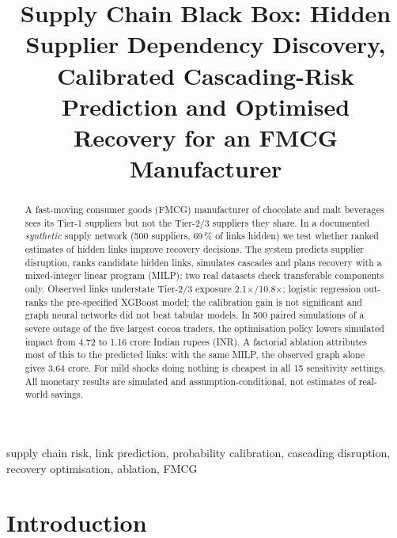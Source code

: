 \documentclass[conference]{IEEEtran}
\newcommand{\GapTwo}{2.1}
\newcommand{\GapThree}{10.8}
\newcommand{\SevA}{4.72}
\newcommand{\SevC}{1.16}
\newcommand{\AblCobs}{3.64}
\newcommand{\SensN}{15}
\begin{document}
\title{Supply Chain Black Box: Hidden Supplier Dependency Discovery, Calibrated Cascading-Risk Prediction and Optimised Recovery for an FMCG Manufacturer}

\author{
}

\maketitle

\begin{abstract}
A fast-moving consumer goods (FMCG) manufacturer of chocolate and malt beverages sees its Tier-1 suppliers but not the Tier-2/3 suppliers they share. In a documented
\emph{synthetic} supply network (500 suppliers, 69\,\% of links hidden) we test whether ranked estimates of hidden links improve recovery
decisions. The system predicts supplier disruption, ranks candidate hidden links, simulates cascades and plans recovery with a mixed-integer linear
program (MILP); two real datasets check transferable components only. Observed links
understate Tier-2/3 exposure \GapTwo$\times$/\GapThree$\times$; logistic regression out-ranks the pre-specified XGBoost model; the calibration gain is not significant and
graph neural networks did not beat tabular models. In 500 paired simulations of a severe outage of the five largest cocoa traders, the
optimisation policy lowers simulated impact from \SevA{} to \SevC{} crore Indian rupees (INR). A factorial ablation attributes most of this to the predicted
links: with the same MILP, the observed graph alone gives \AblCobs{} crore. For mild shocks doing nothing is cheapest in all \SensN{} sensitivity
settings. All monetary results are simulated and assumption-conditional, not estimates of real-world savings.
\end{abstract}

\begin{IEEEkeywords}
supply chain risk, link prediction, probability calibration, cascading disruption, recovery optimisation, ablation, FMCG
\end{IEEEkeywords}

\section{Introduction}
\end{document}
